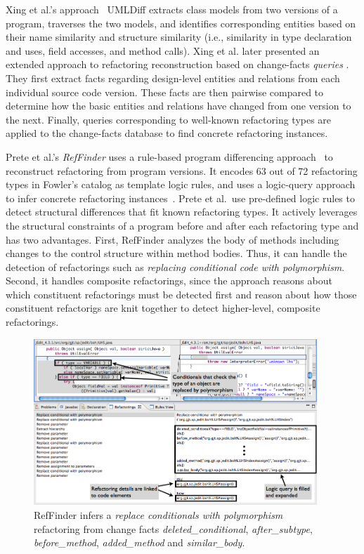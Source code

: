 \documentclass[runningheads,a4paper]{llncs}
\begin{document}
Xing et al.'s approach~\cite{Xing2005} UMLDiff extracts class models from two versions of a program, traverses the two models, and identifies corresponding entities based on their {name similarity} and {structure similarity} {(i.e., similarity in type declaration and uses, field accesses, and method calls)}.
Xing {et al.} later presented an extended approach to refactoring reconstruction based on change-facts {\em queries} \cite{Eleni01}. They first extract facts regarding design-level entities and relations from each individual source code version. These facts are then pairwise compared to determine how the basic entities and relations have changed from one version to the next. Finally, queries corresponding to well-known refactoring types are applied to the change-facts database to find concrete refactoring instances.

Prete et al.'s {\em RefFinder} uses a rule-based program differencing approach~\cite{Prete2010:reffinder, Kim2010:reffinder} to reconstruct refactoring from program versions. It encodes 63 out of 72 refactoring types in Fowler's catalog as template logic rules, and uses a logic-query approach to infer concrete refactoring instances~\cite{Prete2010:reffinder}. Prete et al.~use pre-defined logic rules to detect structural differences that fit known refactoring types. It actively leverages the structural constraints of a program before and after each refactoring type and has two advantages. First, RefFinder analyzes the body of methods including changes to the control structure within method bodies. Thus, it can handle the detection of refactorings such as {\it replacing conditional code with polymorphism}. Second, it handles composite refactorings, since the approach reasons about which constituent refactorings must be detected first and reason about how those constituent refactorigs are knit together to detect higher-level, composite refactorings.

\label{sec:intro} 
\begin{figure}
\centering
\includegraphics[width=0.95\textwidth]{images/reffinder.png}
\caption{RefFinder infers a {\it replace conditionals with polymorphism} refactoring from change facts {\it deleted\_conditional}, {\it after\_subtype}, {\it before\_method}, {\it added\_method} and {\it similar\_body}.\cite{Kim2010:reffinder}}
 \label{fig:reffinderscreenshot}
\end{figure}
\end{document}
